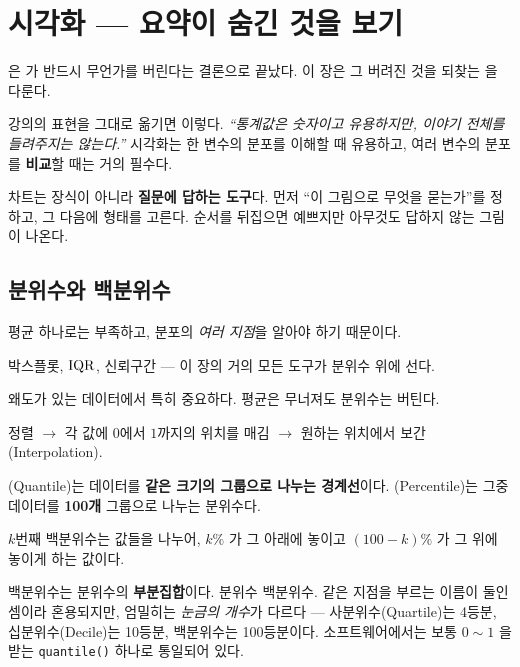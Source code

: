 \chapter{시각화 --- 요약이 숨긴 것을 보기}
\label{ch:visualization}

은 가 반드시 무언가를 버린다는 결론으로
끝났다. 이 장은 그 버려진 것을 되찾는 을 다룬다.

강의의 표현을 그대로 옮기면 이렇다. \emph{``통계값은 숫자이고 유용하지만, 이야기
전체를 들려주지는 않는다.''} 시각화는 한 변수의 분포를 이해할 때 유용하고,
여러 변수의 분포를 \textbf{비교}할 때는 거의 필수다.

\begin{keyidea}
차트는 장식이 아니라 \textbf{질문에 답하는 도구}다. 먼저 ``이 그림으로 무엇을
묻는가''를 정하고, 그 다음에 형태를 고른다. 순서를 뒤집으면 예쁘지만 아무것도
답하지 않는 그림이 나온다.
\end{keyidea}

\section{분위수와 백분위수}
\label{sec:quantile}

\begin{inbrief}
  \item[Why] 평균 하나로는 부족하고, 분포의 \emph{여러 지점}을 알아야 하기 때문이다.
  \item[When] 박스플롯, $\mathrm{IQR}$, 신뢰구간 --- 이 장의 거의 모든 도구가 분위수 위에 선다.
  \item[Where] 왜도가 있는 데이터에서 특히 중요하다. 평균은 무너져도 분위수는 버틴다.
  \item[How] 정렬 $\rightarrow$ 각 값에 $0$에서 $1$까지의 위치를 매김 $\rightarrow$
             원하는 위치에서 보간(Interpolation).
\end{inbrief}

\begin{definition}
\label{def:quantile}
(Quantile)는 데이터를 \textbf{같은 크기의 그룹으로 나누는 경계선}이다.
(Percentile)는 그중 데이터를 \textbf{100개} 그룹으로 나누는 분위수다.

$k$번째 백분위수는 값들을 나누어, $k\%$ 가 그 아래에 놓이고 $(100-k)\%$ 가 그
위에 놓이게 하는 값이다.
\end{definition}

\begin{aside}[둘의 관계]
백분위수는 분위수의 \textbf{부분집합}이다. 분위수 \contains{} 백분위수.
같은 지점을 부르는 이름이 둘인 셈이라 혼용되지만, 엄밀히는 \emph{눈금의 개수}가
다르다 --- 사분위수(Quartile)는 4등분, 십분위수(Decile)는 10등분, 백분위수는
100등분이다. 소프트웨어에서는 보통 $0 \sim 1$ 을 받는 \texttt{quantile()} 하나로
통일되어 있다.
\end{aside}

